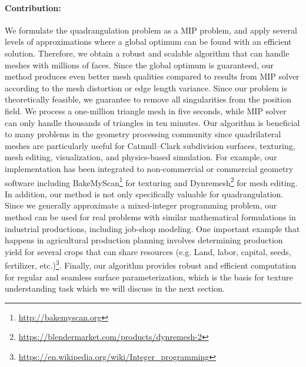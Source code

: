 \paragraph*{Contribution:} We formulate the quadrangulation problem as a MIP problem, and apply several levels of approximations where a global optimum can be found with an efficient solution. Therefore, we obtain a robust and scalable algorithm that can handle meshes with millions of faces. Since the global optimum is guaranteed, our method produces even better mesh qualities compared to results from MIP solver according to the mesh distortion or edge length variance. Since our problem is theoretically feasible, we guarantee to remove all singularities from the position field. We process a one-million triangle mesh in five seconds, while MIP solver can only handle thousands of triangles in ten minutes.
%
Our algorithm is beneficial to many problems in the geometry processing community since quadrilateral meshes are particularly useful for Catmull--Clark subdivision surfaces, texturing, mesh editing, visualization, and physics-based simulation. For example, our implementation has been integrated to non-commercial or commercial geometry software including BakeMyScan\footnote{\url{http://bakemyscan.org}} for texturing and Dynremesh\footnote{\url{https://blendermarket.com/products/dynremesh-2}} for mesh editing.
%
In addition, our method is not only specifically valuable for quadrangulation. Since we generally approximate a mixed-integer programming problem, our method can be used for real problems with similar mathematical formulations in industrial productions, including job-shop modeling. One important example that happens in agricultural production planning involves determining production yield for several crops that can share resources (e.g. Land, labor, capital, seeds, fertilizer, etc.)\footnote{\url{https://en.wikipedia.org/wiki/Integer_programming}}.
%
Finally, our algorithm provides robust and efficient computation for regular and seamless surface parameterization, which is the basis for texture understanding task which we will discuss in the next section.


